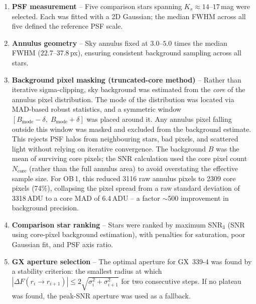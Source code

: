 \documentclass[12pt,a4paper]{article}
\begin{document}
\begin{enumerate}
  \item \textbf{PSF measurement} -- Five comparison stars spanning
        $K_s \approx 14$--$17$\,mag were selected.  Each was fitted with
        a 2D Gaussian; the median FWHM across all five defined the
        reference PSF scale.
  \item \textbf{Annulus geometry} -- Sky annulus fixed at $3.0$--$5.0$
        times the median FWHM ($22.7$--$37.8$\,px), ensuring consistent
        background sampling across all stars.
  \item \textbf{Background pixel masking (truncated-core method)} --
        Rather than iterative sigma-clipping, sky background was estimated
        from the \textit{core} of the annulus pixel distribution.
        The mode of the distribution was located via MAD-based robust
        statistics, and a symmetric window
        $[B_\mathrm{mode} - \delta,\; B_\mathrm{mode} + \delta]$ was
        placed around it.  Any annulus pixel falling outside this window
        was masked and excluded from the background estimate.  This
        rejects PSF halos from neighbouring stars, bad pixels, and
        scattered light without relying on iterative convergence.
        The background $B$ was the mean of surviving core pixels; the
        SNR calculation used the core pixel count $N_\mathrm{core}$
        (rather than the full annulus area) to avoid overstating the
        effective sample size.  For OB\,1, this reduced 3116 raw annulus
        pixels to 2309 core pixels (74\%), collapsing the pixel spread
        from a raw standard deviation of 3318\,ADU to a core MAD of
        6.4\,ADU -- a factor $\sim$500 improvement in background
        precision.
  \item \textbf{Comparison star ranking} -- Stars were ranked by maximum
        SNR$_3$ (SNR using core-pixel background estimation), with
        penalties for saturation, poor Gaussian fit, and PSF axis ratio.
  \item \textbf{GX aperture selection} -- The optimal aperture for GX~339-4
        was found by a stability criterion: the smallest radius at which
        $|\Delta F(r_i \to r_{i+1})| \leq 2\sqrt{\sigma_i^2 + \sigma_{i+1}^2}$
        for two consecutive steps.  If no plateau was found, the
        peak-SNR aperture was used as a fallback.
\end{enumerate}
\end{document}
